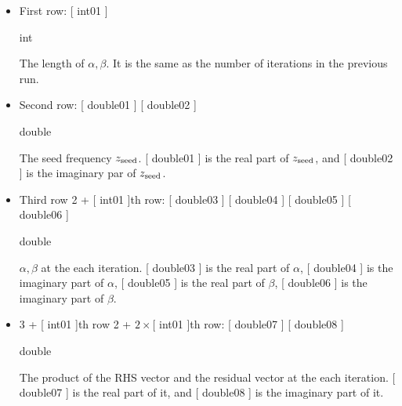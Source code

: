 \documentclass[letterpaper,10pt,dvipdfmx,openany,english]{sphinxmanual}
\begin{document}
\begin{sphinxVerbatim}[commandchars=\\\{\}]
 
    
   
 
 
\end{sphinxVerbatim}
\begin{itemize}
\item {} 
First row: {[} int01 {]}

 int

The length of \(\alpha, \beta\).
It is the same as the number of iterations in the previous run.

\item {} 
Second row: {[} double01 {]} {[} double02 {]}

 double

 The seed frequency \(z_{\rm seed}\).
{[} double01 {]} is the real part of \(z_{\rm seed}\), and
{[} double02 {]} is the imaginary par of \(z_{\rm seed}\).

\item {} 
Third row \sphinxhyphen{} 2 + {[} int01 {]}th row:
{[} double03 {]} {[} double04 {]} {[} double05 {]} {[} double06 {]}

 double

 \(\alpha, \beta\) at the each iteration.
{[} double03 {]} is the real part of \(\alpha\),
{[} double04 {]} is the imaginary part of \(\alpha\),
{[} double05 {]} is the real part of \(\beta\),
{[} double06 {]} is the imaginary part of \(\beta\).

\item {} 
3 + {[} int01 {]}th row \sphinxhyphen{}
2 + \(2\times[\) int01 {]}th row:
{[} double07 {]} {[} double08 {]}

 double

 The product of the RHS vector and
the residual vector at the each iteration.
{[} double07 {]} is the real part of it, and
{[} double08 {]} is the imaginary part of it.

\end{itemize}
\end{document}

